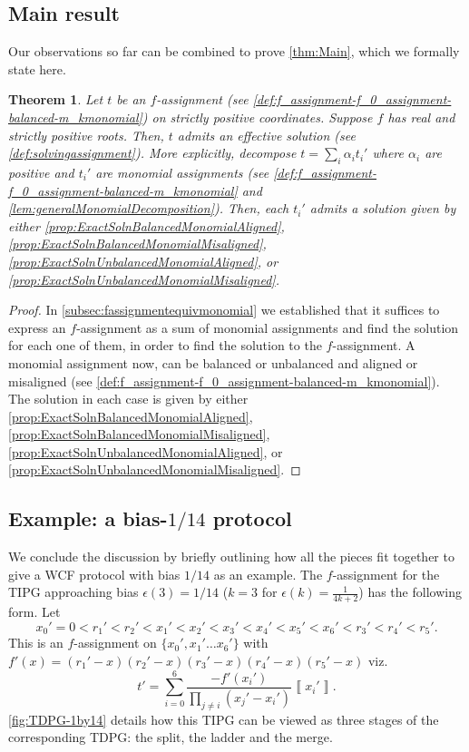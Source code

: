 \documentclass{article}
\newtheorem{theorem}{Theorem}\newtheorem{lemma}[theorem]{Lemma}\newtheorem{proposition}[theorem]{Proposition}\newtheorem{corollary}[theorem]{Corollary}\newtheorem{definition}[theorem]{Definition}\newtheorem{claim}[theorem]{Claim}\newtheorem{remark}[theorem]{Remark}\newtheorem{example}[theorem]{Example}
\newcommand{\atul}[1]{#1} %
\begin{document}
\subsection{Main result}
\label{subsec:mainalgebraic}
Our observations so far can be combined to prove \cref{thm:Main}, which
we formally state here.
\begin{theorem}
  Let $t$ be an $f$-assignment (see \cref{def:f_assignment-f_0_assignment-balanced-m_kmonomial})
  on strictly positive coordinates. %
  Suppose $f$ has real and strictly positive roots. Then, $t$ admits an effective solution (see \cref{def:solvingassignment}). More explicitly, decompose $t=\sum_{i}\alpha_{i}t_{i}'$ where $\alpha_{i}$ are positive and $t_{i}'$ are monomial assignments (see \cref{def:f_assignment-f_0_assignment-balanced-m_kmonomial} and \cref{lem:generalMonomialDecomposition}). Then, each $t_{i}'$ admits a solution
  given by either \cref{prop:ExactSolnBalancedMonomialAligned}, \cref{prop:ExactSolnBalancedMonomialMisaligned},
  \cref{prop:ExactSolnUnbalancedMonomialAligned}, or \cref{prop:ExactSolnUnbalancedMonomialMisaligned}.
\end{theorem}

\begin{proof}
  In \cref{subsec:fassignmentequivmonomial} we established that it suffices to express an $f$-assignment as a sum of monomial assignments and find the solution for each one of them, in order to find the solution to the $f$-assignment. A monomial assignment now, can be balanced or unbalanced and aligned or misaligned (see \cref{def:f_assignment-f_0_assignment-balanced-m_kmonomial}). The solution in each case is given by either
  \cref{prop:ExactSolnBalancedMonomialAligned},
  \cref{prop:ExactSolnBalancedMonomialMisaligned}, \cref{prop:ExactSolnUnbalancedMonomialAligned},
  or \cref{prop:ExactSolnUnbalancedMonomialMisaligned}.
\end{proof}
\subsection{Example: a bias-\texorpdfstring{$1/14$}{1/14} protocol}\label{subsec:1over14}
We conclude the discussion by briefly outlining how all the pieces fit together to give a WCF protocol with bias $1/14$ as an example. The $f$-assignment for the TIPG approaching bias $\epsilon(3)=1/14$
($k=3$ for $\epsilon(k)=\frac{1}{4k+2}$)  has the following
form. Let
\begin{displaymath}
  x_{0}'=0<r_{1}'<r_{2}'<x_{1}'<x_{2}'<x_{3}'<x_{4}'<x_{5}'<x_{6}'<r_{3}'<r_{4}'<r_{5}'.
\end{displaymath}
This is an $f$-assignment
on $\{x_{0}',x_{1}'\dots x_{6}'\}$ with $f'(x)=(r_{1}'-x)(r_{2}'-x)(r_{3}'-x)(r_{4}'-x)(r_{5}'-x)$
viz.
\begin{displaymath}
  t'=\sum_{i=0}^{6}\frac{-f'(x_{i}')}{\prod_{j\neq i}(x_{j}'-x_{i}')}\left\llbracket x_{i}'\right\rrbracket.
\end{displaymath}
\atul{ \cref{fig:TDPG-1by14} details how this TIPG can be viewed as three stages of the corresponding TDPG: the split, the ladder and the merge.}
\end{document}
